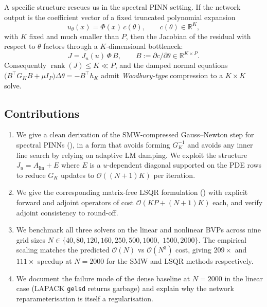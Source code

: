 \documentclass[11pt,a4paper]{article}
\newcommand{\R}{\mathbb{R}}
\newcommand{\rank}{\operatorname{rank}}
\newcommand{\Order}{\mathcal{O}}
\newcommand{\Alin}{A_{\mathrm{lin}}}
\newcommand{\Bt}{B^{\!\top}}
\begin{document}
A specific structure rescues us in the spectral PINN setting. If the network
output is the coefficient vector of a fixed truncated polynomial expansion
\begin{equation}
\label{eq:param}
u_{\theta}(x) = \Phi(x)\, c(\theta), \qquad c(\theta)\in\R^{K},
\end{equation}
with $K$ fixed and much smaller than $P$, then the Jacobian of the residual with
respect to $\theta$ factors through a $K$-dimensional bottleneck:
\begin{equation}
\label{eq:Jfactor}
J = J_{u}(u)\,\Phi\, B, \qquad B := \partial c / \partial \theta \in\R^{K\times P}.
\end{equation}
Consequently $\rank(J) \le K \ll P$, and the damped normal equations
$\bigl(\Bt G_{K} B + \mu I_{P}\bigr)\Delta\theta = -\Bt h_{K}$ admit
\emph{Woodbury-type} compression to a $K\times K$ solve.

\subsection{Contributions}

\begin{enumerate}[leftmargin=*]
    \item We give a clean derivation of the SMW-compressed Gauss--Newton step
        for spectral PINNs (), in a form that avoids forming
        $G_{K}^{-1}$ and avoids any inner line search by relying on adaptive LM
        damping. We exploit the structure $J_{u} = \Alin + E$ where $E$ is a
        $u$-dependent diagonal supported on the PDE rows to reduce $G_{K}$
        updates to $\Order((N+1)K)$ per iteration.
    \item We give the corresponding matrix-free LSQR formulation
        () with explicit forward and adjoint operators of cost
        $\Order(KP + (N+1)K)$ each, and verify adjoint consistency to round-off.
    \item We benchmark all three solvers on the linear and nonlinear BVPs
        across nine grid sizes $N\in\{40, 80, 120, 160, 250, 500, 1000,$
        $1500, 2000\}$. The empirical scaling matches the predicted $\Order(N)$ vs $\Order(N^{3})$
        cost, giving $209\times$ and $111\times$ speedup at $N=2000$ for the
        SMW and LSQR methods respectively.
    \item We document the failure mode of the dense baseline at $N=2000$ in the
        linear case (LAPACK \texttt{gelsd} returns garbage) and explain why
        the network reparameterisation is itself a regularisation.
\end{enumerate}
\end{document}
